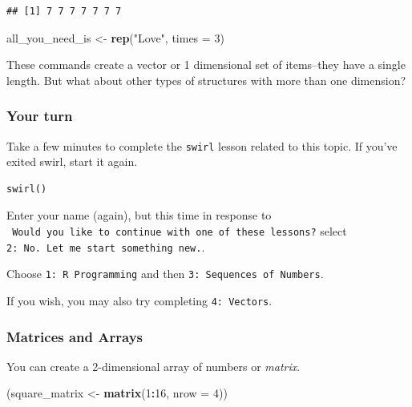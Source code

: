 \documentclass[]{article}
\newenvironment{Shaded}{\begin{snugshade}}{\end{snugshade}}
\newcommand{\KeywordTok}[1]{\textcolor[rgb]{0.13,0.29,0.53}{\textbf{#1}}}
\newcommand{\DataTypeTok}[1]{\textcolor[rgb]{0.13,0.29,0.53}{#1}}
\newcommand{\DecValTok}[1]{\textcolor[rgb]{0.00,0.00,0.81}{#1}}
\newcommand{\StringTok}[1]{\textcolor[rgb]{0.31,0.60,0.02}{#1}}
\newcommand{\OperatorTok}[1]{\textcolor[rgb]{0.81,0.36,0.00}{\textbf{#1}}}
\newcommand{\NormalTok}[1]{#1}
\begin{document}
\begin{verbatim}
## [1] 7 7 7 7 7 7 7
\end{verbatim}

\begin{Shaded}
\begin{Highlighting}[]
\NormalTok{all_you_need_is <-}\StringTok{ }\KeywordTok{rep}\NormalTok{(}\StringTok{"Love"}\NormalTok{, }\DataTypeTok{times =} \DecValTok{3}\NormalTok{)}
\end{Highlighting}
\end{Shaded}

These commands create a vector or 1 dimensional set of items--they have
a single length. But what about other types of structures with more than
one dimension?

\subsubsection{Your turn}\label{your-turn-1}

Take a few minutes to complete the \texttt{swirl} lesson related to this
topic. If you've exited swirl, start it again.

\begin{verbatim}
swirl()
\end{verbatim}

Enter your name (again), but this time in response to
\texttt{\textbar{}\ Would\ you\ like\ to\ continue\ with\ one\ of\ these\ lessons?}
select \texttt{2:\ No.\ Let\ me\ start\ something\ new.}.

Choose \texttt{1:\ R\ Programming} and then
\texttt{3:\ Sequences\ of\ Numbers}.

If you wish, you may also try completing \texttt{4:\ Vectors}.

\subsubsection{Matrices and Arrays}\label{matrices-and-arrays}

You can create a 2-dimensional array of numbers or \emph{matrix}.

\begin{Shaded}
\begin{Highlighting}[]
\NormalTok{(square_matrix <-}\StringTok{ }\KeywordTok{matrix}\NormalTok{(}\DecValTok{1}\OperatorTok{:}\DecValTok{16}\NormalTok{, }\DataTypeTok{nrow =} \DecValTok{4}\NormalTok{))}
\end{Highlighting}
\end{Shaded}
\end{document}
